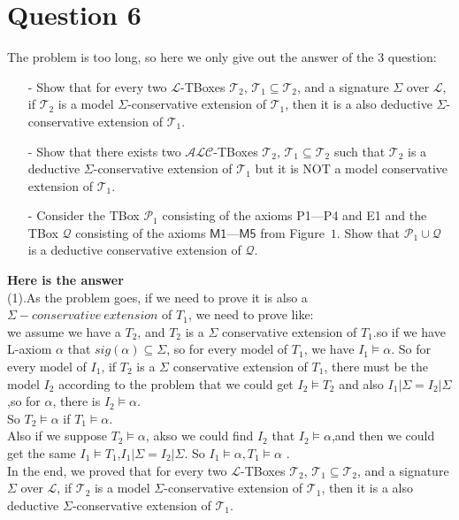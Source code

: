 \documentclass{article}
\begin{document}
    \section{Question 6}
    The problem is too long, so here we only give out the answer of the 3 question:\\
    \begin{itemize}
        \item[-] Show that for every two $\mathcal{L}$-TBoxes $\mathcal{T}_2$, $\mathcal{T}_{1}\subseteq\mathcal{T}_{2}$, and a signature $\Sigma$ over $\mathcal{L}$, if $\mathcal{T}_{2}$ is a model $\Sigma$-conservative extension of $\mathcal{T}_{1}$, then it is a also deductive $\Sigma$-conservative extension of $\mathcal{T}_{1}$.
        \item[-] Show that there exists two $\mathcal{ALC}$-TBoxes $\mathcal{T}_2$, $\mathcal{T}_{1}\subseteq\mathcal{T}_{2}$ such that $\mathcal{T}_{2}$ is a deductive $\Sigma$-conservative extension of $\mathcal{T}_{1}$ but it is NOT a model conservative extension of $\mathcal{T}_{1}$.
        \item[-] Consider the TBox $\mathcal{P}_{1}$ consisting of the axioms \textsf{P1---P4} and \textsf{E1} and the TBox $\mathcal{Q}$ consisting of the axioms $\textsf{M1---M5}$ from Figure~$1$. Show that $\mathcal{P}_{1}\cup\mathcal{Q}$ is a deductive conservative extension of $\mathcal{Q}$.
    \end{itemize}
    \textbf{Here is the answer}\\
    (1).As the problem goes, if we need to prove it is also a $\Sigma-conservative\ extension$ of $T_1$, we need to prove like:\\
    we assume we have a $T_2$, and $T_2$ is a $\Sigma$ conservative extension of $T_1$.so if we have L-axiom $
    \alpha$ that $sig(\alpha)\subseteq\Sigma$, so for every model of $T_1$, we have $I_1 \models \alpha$. 
    So for every model of $I_1$, if $T_2$ is a $\Sigma$ conservative extension of $T_1$, there must be the model $I_2$ according to the problem that we could get
    $I_2 \models T_2$ and also $I_1|\Sigma = I_2|\Sigma$,so for $\alpha$, there is $I_2\models \alpha$.\\
    So $T_2 \models \alpha$ if $T_1\models \alpha$.\\
    Also if we suppose $T_2\models \alpha$,  akso we could find $I_2$ that $I_2\models \alpha$,and then we could get the same $I_1 \models T_1$,$I_1|\Sigma = I_2|\Sigma$.
    So $I_1 \models \alpha,T_1 \models\alpha$ .\\
    In the end, we proved that for every two $\mathcal{L}$-TBoxes $\mathcal{T}_2$, $\mathcal{T}_{1}\subseteq\mathcal{T}_{2}$, and a signature $\Sigma$ over $\mathcal{L}$, if $\mathcal{T}_{2}$ is a model $\Sigma$-conservative extension of $\mathcal{T}_{1}$, then it is a also deductive $\Sigma$-conservative extension of $\mathcal{T}_{1}$.\\
\end{document}

